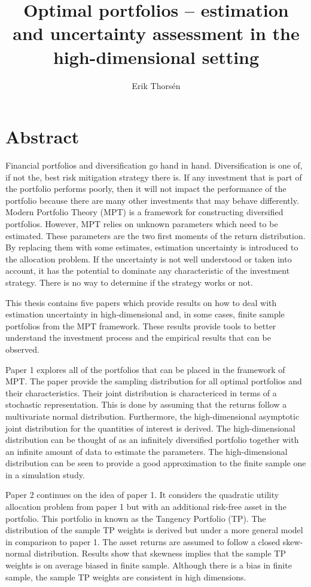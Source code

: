\documentclass[12pt, oneside]{book}\usepackage{knitr}
\title{Optimal portfolios -- estimation and uncertainty assessment in the high-dimensional setting}
\author{Erik Thorsén}
\begin{document}


\maketitle


\chapter*{\centering Abstract}
{\small
Financial portfolios and diversification go hand in hand.
Diversification is one of, if not the, best risk mitigation strategy there is.
If any investment that is part of the portfolio performs poorly, then it will not impact the performance of the portfolio because there are many other investments that may behave differently.
Modern Portfolio Theory (MPT) is a framework for constructing diversified portfolios.
However, MPT relies on unknown parameters which need to be estimated. 
These parameters are the two first moments of the return distribution.
By replacing them with some estimates, estimation uncertainty is introduced to the allocation problem.
If the uncertainty is not well understood or taken into account, it has the potential to dominate any characteristic of the investment strategy.
There is no way to determine if the strategy works or not.

This thesis contains five papers which provide results on how to deal with estimation uncertainty in high-dimensional and, in some cases, finite sample portfolios from the MPT framework.
These results provide tools to better understand the investment process and the empirical results that can be observed.

Paper 1 explores all of the portfolios that can be placed in the framework of MPT. 
The paper provide the sampling distribution for all optimal portfolios and their characteristics.
Their joint distribution is charactericed in terms of a stochastic representation.
This is done by assuming that the returns follow a multivariate normal distribution.
Furthermore, the high-dimensional asymptotic joint distribution for the quantities of interest is derived.
The high-dimensional distribution can be thought of as an infinitely diversified portfolio together with an infinite amount of data to estimate the parameters.
The high-dimensional distribution can be seen to provide a good approximation to the finite sample one in a simulation study.

Paper 2 continues on the idea of paper 1.
It considers the quadratic utility allocation problem from paper 1 but with an additional risk-free asset in the portfolio.
This portfolio in known as the Tangency Portfolio (TP).
The distribution of the sample TP weights is derived but under a more general model in comparison to paper 1. 
The asset returns are assumed to follow a closed skew-normal distribution.
Results show that skewness implies that the sample TP weights is on average biased in finite sample.
Although there is a bias in finite sample, the sample TP weights are consistent in high dimensions.

}
\end{document}
